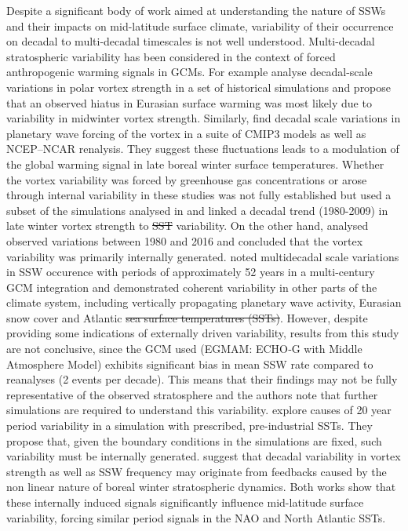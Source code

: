 \documentclass[wcd, manuscript]{copernicus}
\providecommand{\DIFadd}[1]{{\protect\color{blue}\uwave{#1}}} %
\providecommand{\DIFdel}[1]{{\protect\color{red}\sout{#1}}}                      %
\providecommand{\DIFaddbegin}{} %
\providecommand{\DIFaddend}{} %
\providecommand{\DIFdelbegin}{} %
\providecommand{\DIFdelend}{} %
\begin{document}
Despite a significant body of work aimed at understanding the nature of SSWs and their impacts on mid-latitude surface climate, variability of their occurrence on decadal to multi-decadal timescales is not well understood. Multi-decadal stratospheric variability has been considered in the context of forced anthropogenic warming signals in GCMs. For example \cite{Garfinkel2017} analyse decadal-scale variations in polar vortex strength in a set of historical simulations and propose that an observed hiatus in Eurasian surface warming was most likely due to variability in midwinter vortex strength. Similarly, \cite{cohen2009} find decadal scale variations in planetary wave forcing of the vortex in a suite of CMIP3 models as well as NCEP–NCAR renalysis. They suggest these fluctuations leads to a modulation of the global warming signal in late boreal winter surface temperatures. Whether the vortex variability was forced by greenhouse gas concentrations or arose through internal variability in these studies was not fully established but \cite{Garfinkel2015} used a subset of the simulations analysed in \cite{Garfinkel2017} and linked a decadal trend (1980-2009) in late winter vortex strength to \DIFdelbegin \DIFdel{SST }\DIFdelend \DIFaddbegin \DIFadd{sea surface temperature (SST) }\DIFaddend variability. On the other hand, \cite{Seviour2017} analysed observed variations between 1980 and 2016 and concluded that the vortex variability was primarily internally generated. \cite{Schimanke2011} noted  multidecadal scale variations in SSW occurence with periods of approximately 52 years in a multi-century GCM integration and demonstrated coherent variability in other parts of the climate system, including vertically propagating planetary wave activity, Eurasian snow cover and Atlantic \DIFdelbegin \DIFdel{sea surface temperatures (SSTs)}\DIFdelend \DIFaddbegin \DIFadd{SSTs}\DIFaddend . However, despite providing some indications of externally driven variability, results from this study are not conclusive, since the GCM used (EGMAM: ECHO‐G with Middle Atmosphere Model) exhibits significant bias in mean SSW rate compared to reanalyses (2 events per decade). This means that their findings may not be fully representative of the observed stratosphere and the authors note that further simulations are required to understand this variability. \cite{Manzini2012} explore causes of 20 year period variability in a simulation with prescribed, pre-industrial SSTs. They propose that, given the boundary conditions in the simulations are fixed, such variability must be internally generated. \cite{Butchart2000} suggest that decadal variability in vortex strength as well as SSW frequency may originate from feedbacks caused by the non linear nature of boreal winter stratospheric dynamics. Both works show that these internally induced signals significantly influence mid-latitude surface variability, forcing similar period signals in the NAO and North Atlantic SSTs.
\end{document}
